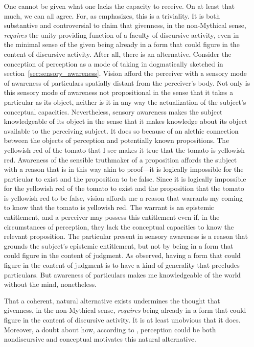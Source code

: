 \documentclass[12pt]{article}
\begin{document}
One cannot be given what one lacks the capacity to receive. On at least that much, we can all agree. For, as \citet{Travis:2008uq} emphasizes, this is a triviality. It is both substantive and controversial to claim that givenness, in the non-Mythical sense, \emph{requires} the unity-providing function of a faculty of discursive activity, even in the minimal sense of the given being already in a form that could figure in the content of discursive activity. After all, there is an alternative. Consider the conception of perception as a mode of taking in dogmatically sketched in section~\ref{sec:sensory_awareness}. Vision afford the perceiver with a sensory mode of awareness of particulars spatially distant from the perceiver's body. Not only is this sensory mode of awareness not propositional in the sense that it takes a particular as its object, neither is it in any way the actualization of the subject's conceptual capacities. Nevertheless, sensory awareness makes the subject knowledgeable of its object in the sense that it makes knowledge about its object available to the perceiving subject. It does so because of an alethic connection between the objects of perception and potentially known propositions. The yellowish red of the tomato that I see makes it true that the tomato is yellowish red. Awareness of the sensible truthmaker of a proposition affords the subject with a reason that is in this way akin to proof---it is logically impossible for the particular to exist and the proposition to be false. Since it is logically impossible for the yellowish red of the tomato to exist and the proposition that the tomato is yellowish red to be false, vision affords me a reason that warrants my coming to know that the tomato is yellowish red. The warrant is an epistemic entitlement, and a perceiver may possess this entitlement even if, in the circumstances of perception, they lack the conceptual capacities to know the relevant proposition. The particular present in sensory awareness is a reason that grounds the subject's epistemic entitlement, but not by being in a form that could figure in the content of judgment. As \citet[44]{Prichard:1909yg} observed, having a form that could figure in the content of judgment is to have a kind of generality that precludes particulars. But awareness of particulars makes me knowledgeable of the world without the mind, nonetheless. 

That a coherent, natural alternative exists undermines the thought that givenness, in the non-Mythical sense, \emph{requires} being already in a form that could figure in the content of discursive activity. It is at least unobvious that it does. Moreover, a doubt about how, according to \citet{McDowell:2008fk}, perception could be both nondiscursive and conceptual motivates this natural alternative.
\end{document}
